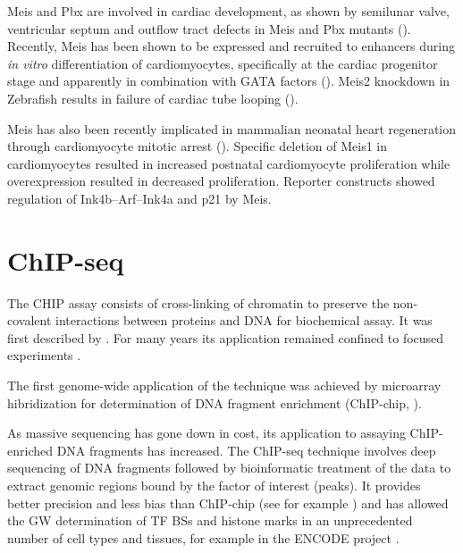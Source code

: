 Meis and Pbx are involved in cardiac development, as shown by semilunar valve, ventricular septum and outflow tract defects in Meis and Pbx mutants (\cite{Stankunas2008}). Recently, Meis has been shown to be expressed and recruited to enhancers during \textit{in vitro} differentiation of cardiomyocytes, specifically at the cardiac progenitor stage and apparently in combination with GATA factors (\cite{Wamstad2012}). Meis2 knockdown in Zebrafish results in failure of cardiac tube looping (\cite{Paige2012}). 

Meis has also been recently implicated in mammalian neonatal heart regeneration through cardiomyocyte mitotic arrest (\cite{Mahmoud2013}). Specific deletion of Meis1 in cardiomyocytes resulted in increased postnatal cardiomyocyte proliferation while overexpression resulted in decreased proliferation. Reporter constructs showed regulation of Ink4b–Arf–Ink4a and p21 by Meis.


\section{ChIP-seq}


The \ac{CHIP} assay consists of cross-linking of chromatin to preserve the non-covalent interactions between proteins and DNA for biochemical assay. It was first described by \textcite{Solomon1988}. For many years its application remained confined to focused experiments \parencite{Mardis2007}.

The first genome-wide application of the technique was achieved by microarray hibridization for determination of DNA fragment enrichment (ChIP-chip, \cite{Ren2000}). 

As massive sequencing has gone down in cost, its application to assaying ChIP-enriched DNA fragments has increased. The ChIP-seq technique \parencite{Robertson2007} involves deep sequencing of DNA fragments followed by bioinformatic treatment of the data to extract genomic regions bound by the factor of interest (peaks). It provides better precision and less bias than ChIP-chip (see for example \cite{Rhee2011}) and has allowed the \ac{GW} determination of \ac{TF} \acp{BS} and histone  marks in an unprecedented number of cell types and tissues, for example in the ENCODE project \parencite{Encode2004, Encode2007, Encode2012}.



